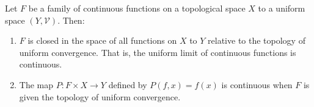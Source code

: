 Let $F$ be a family of continuous functions on a topological space $X$ to a uniform space $(Y, \mathcal{V})$. Then:

\begin{enumerate}
\item[(a)] $F$ is closed in the space of all functions on $X$ to $Y$ relative to the topology of uniform convergence. That is, the uniform limit of continuous functions is continuous.

\item[(b)] The map $P : F \times X \to Y$ defined by $P(f,x) = f(x)$ is continuous when $F$ is given the topology of uniform convergence.
\end{enumerate}
